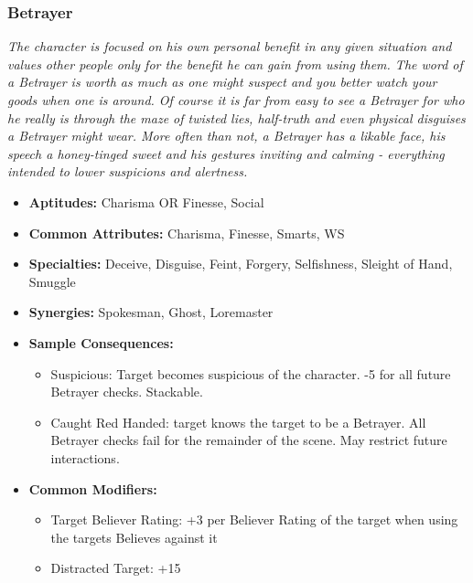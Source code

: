\subsubsection{Betrayer}\label{Betrayer}
\textit{The character is focused on his own personal benefit in any given situation and values other people only for the benefit he can gain from using them.
The word of a Betrayer is worth as much as one might suspect and you better watch your goods when one is around.
Of course it is far from easy to see a Betrayer for who he really is through the maze of twisted lies, half-truth and even physical disguises a Betrayer might wear.
More often than not, a Betrayer has a likable face, his speech a honey-tinged sweet and his gestures inviting and calming - everything intended to lower suspicions and alertness.}
\begin{itemize}
	\item \textbf{Aptitudes:} Charisma OR Finesse, Social
	\item \textbf{Common Attributes:}  Charisma, Finesse, Smarts, WS
	\item \textbf{Specialties:} Deceive, Disguise, Feint, Forgery, Selfishness, Sleight of Hand, Smuggle
	\item \textbf{Synergies:} Spokesman, Ghost, Loremaster
	\item \textbf{Sample Consequences:} 
	\begin{itemize}
		\item Suspicious: Target becomes suspicious of the character. -5 for all future Betrayer checks. Stackable.
		\item Caught Red Handed: target knows the target to be a Betrayer. All Betrayer checks fail for the remainder of the scene. May restrict future interactions.
	\end{itemize}
	\item \textbf{Common Modifiers:}
	\begin{itemize}
		\item Target Believer Rating: +3 per Believer Rating of the target when using the targets Believes against it
		\item Distracted Target: +15
	\end{itemize}
\end{itemize}

